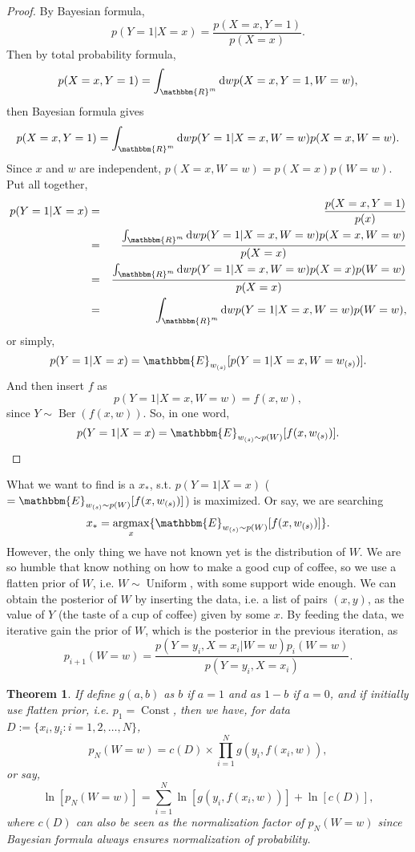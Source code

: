 \documentclass{article}
\newcommand{\assign}{:=}
\newcommand{\mathd}{\mathrm{d}}
\newcommand{\tmop}[1]{\ensuremath{\operatorname{#1}}}
\newtheorem{theorem}{Theorem}
\begin{document}
\begin{proof}
  By Bayesian formula,
  \[ p ( Y=1|X=x ) = \frac{p ( X=x,Y=1 )}{p ( X=x )} . \]
  Then by total probability formula,
  \[ p ( X=x,Y=1 ) = \int_{\mathbbm{R}^{m}} \mathd w p ( X=x,Y=1,W=w ) , \]
  then Bayesian formula gives
  \[ p ( X=x,Y=1 ) = \int_{\mathbbm{R}^{m}} \mathd w p ( Y=1|X=x,W=w )  p (
     X=x,W=w ) . \]
  Since $x$ and $w$ are independent, $p ( X=x,W=w ) =p ( X=x )  p ( W=w )$.
  Put all together,
  \begin{eqnarray*}
    p ( Y=1|X=x ) & = & \frac{p ( X=x,Y=1 )}{p ( x )}\\
    & = & \frac{\int_{\mathbbm{R}^{m}} \mathd w p ( Y=1|X=x,W=w )  p (
    X=x,W=w )}{p ( X=x )}\\
    & = & \frac{\int_{\mathbbm{R}^{m}} \mathd w p ( Y=1|X=x,W=w )  p ( X=x ) 
    p ( W=w )}{p ( X=x )}\\
    & = & \int_{\mathbbm{R}^{m}} \mathd w p ( Y=1|X=x,W=w )  p ( W=w ) ,
  \end{eqnarray*}
  or simply,
  \[ p ( Y=1|X=x ) =\mathbbm{E}_{w_{( s )}} [  p ( Y=1|X=x,W=w_{( s )} ) ] .
  \]
  And then insert $f$ as
  \[ p ( Y=1|X=x,W=w ) =f ( x,w ) , \]
  since $Y \sim \tmop{Ber} ( f ( x,w ) )$. So, in one word,
  \[ p ( Y=1|X=x ) =\mathbbm{E}_{w_{( s )} \sim p ( W )} [  f ( x,w_{( s )} )
     ] . \]
\end{proof}

What we want to find is a $x_{\ast}$, s.t. $p ( Y=1|X=x )$
($=\mathbbm{E}_{w_{( s )} \sim p ( W )} [  f ( x,w_{( s )} ) ]$) is maximized.
Or say, we are searching
\[ x_{\ast} = \underset{x}{\tmop{argmax}} \{ \mathbbm{E}_{w_{( s )} \sim p ( W
   )} [  f ( x,w_{( s )} ) ] \} . \]
However, the only thing we have not known yet is the distribution of $W$. We
are so humble that know nothing on how to make a good cup of coffee, so we use
a flatten prior of $W$, i.e. $W \sim \tmop{Uniform}$, with some support wide
enough. We can obtain the posterior of $W$ by inserting the data, i.e. a list
of pairs $( x,y )$, as the value of $Y$ (the taste of a cup of coffee) given
by some $x$. By feeding the data, we iterative gain the prior of $W$, which is
the posterior in the previous iteration, as
\[ p_{i+1} ( W=w ) = \frac{p ( Y=y_{i} ,X=x_{i} |W=w )  p_{i} ( W=w )}{p (
   Y=y_{i} ,X=x_{i} )} . \]
\begin{theorem}
  If define $g ( a,b )$ as $b$ if $a=1$ and as $1-b$ if $a=0$, and if
  initially use flatten prior, i.e. $p_{1} = \tmop{Const}$, then we have, for
  data $D \assign \{ x_{i} ,y_{i} :i=1,2, \ldots ,N \}$,
  \[ p_{N} ( W=w ) =c ( D ) \times \prod_{i=1}^{N} g ( y_{i} ,f ( x_{i} ,w ) )
     , \]
  or say,
  \[ \ln [ p_{N} ( W=w ) ] = \sum_{i=1}^{N}   \ln [ g ( y_{i} ,f ( x_{i} ,w )
     ) ] + \ln [ c ( D ) ] , \]
  where $c ( D )$ can also be seen as the normalization factor of $p_{N} ( W=w
  )$ since Bayesian formula always ensures normalization of probability.
\end{theorem}
\end{document}
